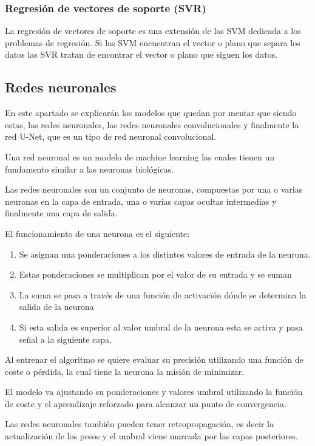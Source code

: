 \subsubsection{Regresión de vectores de soporte (SVR)}
La regresión de vectores de soporte es una extensión de las SVM dedicada a los problemas de regresión. Si las SVM encuentran el vector o plano que separa los datos las SVR tratan de encontrar el vector o plano que siguen los datos.


\subsection{Redes neuronales}
En este apartado se explicarán los modelos que quedan por mentar que siendo estas, las redes neuronales, las redes neuronales convolucionales y finalmente la red U-Net, que es un tipo de red neuronal convolucional. 

Una red neuronal\cite{ibmQuNeuronal} es un modelo de machine learning las cuales tienen un fundamento similar a las neuronas biológicas.

Las redes neuronales son un conjunto de neuronas, compuestas por una o varias neuronas en la capa de entrada, una o varias capas ocultas intermedias y finalmente una capa de salida. 

El funcionamiento de una neurona es el siguiente:
\begin{enumerate}
	\item Se asignan una ponderaciones a los distintos valores de entrada de la neurona.
	
	\item Estas ponderaciones se multiplican por el valor de su entrada y se suman
	
	\item La suma se pasa a través de una función de activación dónde se determina la salida de la neurona
	
	\item Si esta salida es superior al valor umbral de la neurona esta se activa y pasa señal a la siguiente capa.
	
\end{enumerate}
Al entrenar el algoritmo se quiere evaluar su precisión utilizando una función de coste o pérdida, la cual tiene la neurona la misión de minimizar.

El modelo va ajustando su ponderaciones y valores umbral utilizando la función de coste y el aprendizaje reforzado para alcanzar un punto de convergencia.

Las redes neuronales también pueden tener retropropagación, es decir la actualización de los pesos y el umbral viene marcada por las capas posteriores.

